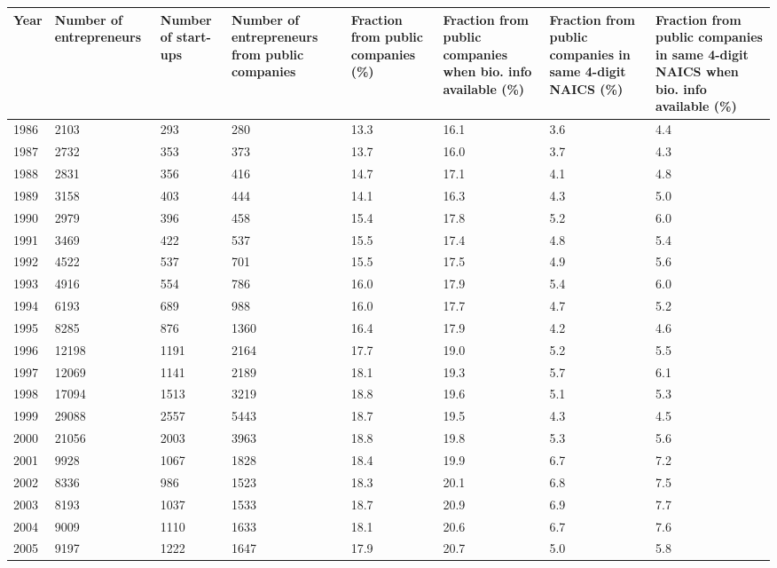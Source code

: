 \begin{table}[ht]
\centering
\begingroup\footnotesize
\begin{tabular}{p{1.75cm}p{1.75cm}p{1.75cm}p{1.75cm}p{1.75cm}p{1.75cm}p{1.75cm}p{1.75cm}}
  \toprule
Year & Number of entrepreneurs & Number of start-ups & Number of entrepreneurs from public companies & Fraction from public companies (\%) & Fraction from public companies when bio. info available (\%) & Fraction from public companies in same 4-digit NAICS (\%) & Fraction from public companies in same 4-digit NAICS when bio. info available (\%) \\ 
  \midrule
1986 & 2103 & 293 & 280 & 13.3 & 16.1 & 3.6 & 4.4 \\ 
  1987 & 2732 & 353 & 373 & 13.7 & 16.0 & 3.7 & 4.3 \\ 
  1988 & 2831 & 356 & 416 & 14.7 & 17.1 & 4.1 & 4.8 \\ 
  1989 & 3158 & 403 & 444 & 14.1 & 16.3 & 4.3 & 5.0 \\ 
  1990 & 2979 & 396 & 458 & 15.4 & 17.8 & 5.2 & 6.0 \\ 
  1991 & 3469 & 422 & 537 & 15.5 & 17.4 & 4.8 & 5.4 \\ 
  1992 & 4522 & 537 & 701 & 15.5 & 17.5 & 4.9 & 5.6 \\ 
  1993 & 4916 & 554 & 786 & 16.0 & 17.9 & 5.4 & 6.0 \\ 
  1994 & 6193 & 689 & 988 & 16.0 & 17.7 & 4.7 & 5.2 \\ 
  1995 & 8285 & 876 & 1360 & 16.4 & 17.9 & 4.2 & 4.6 \\ 
  1996 & 12198 & 1191 & 2164 & 17.7 & 19.0 & 5.2 & 5.5 \\ 
  1997 & 12069 & 1141 & 2189 & 18.1 & 19.3 & 5.7 & 6.1 \\ 
  1998 & 17094 & 1513 & 3219 & 18.8 & 19.6 & 5.1 & 5.3 \\ 
  1999 & 29088 & 2557 & 5443 & 18.7 & 19.5 & 4.3 & 4.5 \\ 
  2000 & 21056 & 2003 & 3963 & 18.8 & 19.8 & 5.3 & 5.6 \\ 
  2001 & 9928 & 1067 & 1828 & 18.4 & 19.9 & 6.7 & 7.2 \\ 
  2002 & 8336 & 986 & 1523 & 18.3 & 20.1 & 6.8 & 7.5 \\ 
  2003 & 8193 & 1037 & 1533 & 18.7 & 20.9 & 6.9 & 7.7 \\ 
  2004 & 9009 & 1110 & 1633 & 18.1 & 20.6 & 6.7 & 7.6 \\ 
  2005 & 9197 & 1222 & 1647 & 17.9 & 20.7 & 5.0 & 5.8 \\ 

\end{tabular}
\end{table}
